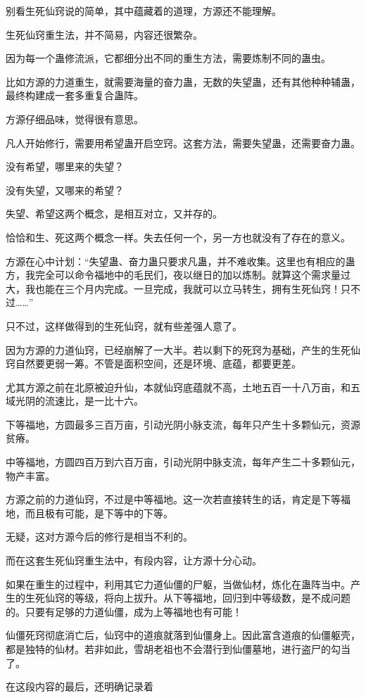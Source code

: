 \begin{this_body}
别看生死仙窍说的简单，其中蕴藏着的道理，方源还不能理解。

生死仙窍重生法，并不简易，内容还很繁杂。

因为每一个蛊修流派，它都细分出不同的重生方法，需要炼制不同的蛊虫。

比如方源的力道重生，就需要海量的奋力蛊，无数的失望蛊，还有其他种种辅蛊，最终构建成一套多重复合蛊阵。

方源仔细品味，觉得很有意思。

凡人开始修行，需要用希望蛊开启空窍。这套方法，需要失望蛊，还需要奋力蛊。

没有希望，哪里来的失望？

没有失望，又哪来的希望？

失望、希望这两个概念，是相互对立，又并存的。

恰恰和生、死这两个概念一样。失去任何一个，另一方也就没有了存在的意义。

方源在心中计划：“失望蛊、奋力蛊只要求凡蛊，并不难收集。这里也有相应的蛊方，我完全可以命令福地中的毛民们，夜以继日的加以炼制。就算这个需求量过大，我也能在三个月内完成。一旦完成，我就可以立马转生，拥有生死仙窍！只不过……”

只不过，这样做得到的生死仙窍，就有些差强人意了。

因为方源的力道仙窍，已经崩解了一大半。若以剩下的死窍为基础，产生的生死仙窍自然要更弱一筹。不管是面积空间，还是环境、底蕴，都要更差。

尤其方源之前在北原被迫升仙，本就仙窍底蕴就不高，土地五百一十八万亩，和五域光阴的流速比，是一比十六。

下等福地，方圆最多三百万亩，引动光阴小脉支流，每年只产生十多颗仙元，资源贫瘠。

中等福地，方圆四百万到六百万亩，引动光阴中脉支流，每年产生二十多颗仙元，物产丰富。

方源之前的力道仙窍，不过是中等福地。这一次若直接转生的话，肯定是下等福地，而且极有可能，是下等中的下等。

无疑，这对方源今后的修行是相当不利的。

而在这套生死仙窍重生法中，有段内容，让方源十分心动。

如果在重生的过程中，利用其它力道仙僵的尸躯，当做仙材，炼化在蛊阵当中。产生的生死仙窍的等级，将向上拔升。从下等福地，回归到中等级数，是不成问题的。只要有足够的力道仙僵，成为上等福地也有可能！

仙僵死窍彻底消亡后，仙窍中的道痕就落到仙僵身上。因此富含道痕的仙僵躯壳，都是独特的仙材。若非如此，雪胡老祖也不会潜行到仙僵墓地，进行盗尸的勾当了。

在这段内容的最后，还明确记录着


\end{this_body}
